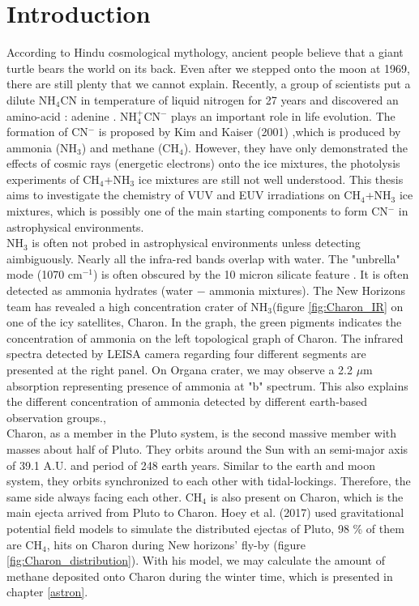 \chapter{\protect Introduction}
\label{introduction}

According to Hindu cosmological mythology, ancient people believe that a giant turtle bears the world on its back. Even after we stepped onto the moon at 1969, there are still plenty that we cannot explain. Recently, a group of scientists put a dilute NH$_4$CN in temperature of liquid nitrogen for 27 years and discovered an amino-acid : adenine \cite{miyakawa2002cold}. NH$_4^+$CN$^-$ plays an important role in life evolution. The formation of CN$^-$ is proposed by Kim and Kaiser (2001) \cite{kim},which is produced by ammonia (NH$_3$) and methane (CH$_4$). However, they have only demonstrated the effects of cosmic rays (energetic electrons) onto the ice mixtures, the photolysis experiments of CH$_4$+NH$_3$ ice mixtures are still not well understood. This thesis aims to investigate the chemistry of VUV and EUV irradiations on CH$_4$+NH$_3$ ice mixtures, which is possibly one of the main starting components to form CN$^-$ in astrophysical environments.\\

NH$_3$ is often not probed in astrophysical environments unless detecting aimbiguously. Nearly all the infra-red bands overlap with water. The "unbrella" mode (1070 cm$^{-1}$) is often obscured by the 10 micron silicate feature \cite{d1986time}. It is often detected as ammonia hydrates (water $-$ ammonia mixtures)\cite{cook2007near}. The New Horizons team has revealed a high concentration crater of NH$_3$\cite{grundy2016surface}(figure \ref{fig:Charon_IR} on one of the icy satellites, Charon. In the graph, the green pigments indicates the concentration of ammonia on the left topological graph of Charon. The infrared spectra detected by LEISA camera regarding four different segments are presented at the right panel. On Organa crater, we may observe a 2.2 $\mu$m absorption representing presence of ammonia at "b" spectrum. This also explains the different concentration of ammonia detected by different earth-based observation groups.\cite{cook2007near},\cite{brown2000evidence}\\

Charon, as a member in the Pluto system, is the second massive member with masses about half of Pluto. They orbits around the Sun with an semi-major axis of 39.1 A.U. and period of 248 earth years. Similar to the earth and moon system, they orbits synchronized to each other with tidal-lockings. Therefore, the same side always facing each other. CH$_4$ is also present on Charon, which is the main ejecta arrived from Pluto to Charon. Hoey et al. (2017)\cite{hoey2017rarefied} used gravitational potential field models to simulate the distributed ejectas of Pluto, 98 \% of them are CH$_4$, hits on Charon during New horizons' fly-by (figure \ref{fig:Charon_distribution}). With his model, we may calculate the amount of methane deposited onto Charon during the winter time, which is presented in chapter \ref{astron}.\\

